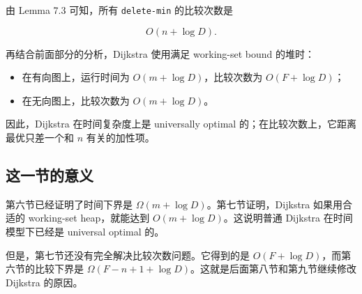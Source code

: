 \documentclass[UTF8]{ctexart}
\begin{document}
由 Lemma 7.3 可知，所有 \texttt{delete-min} 的比较次数是

\[
O(n+\log D).
\]

再结合前面部分的分析，Dijkstra 使用满足 working-set bound 的堆时：

\begin{itemize}
  \item 在有向图上，运行时间为 \(O(m+\log D)\)，比较次数为 \(O(F+\log D)\)；
  \item 在无向图上，比较次数为 \(O(m+\log D)\)。
\end{itemize}

因此，Dijkstra 在时间复杂度上是 universally optimal 的；在比较次数上，它距离最优只差一个和 \(n\) 有关的加性项。

\subsection*{这一节的意义}

第六节已经证明了时间下界是 \(\Omega(m+\log D)\)。第七节证明，Dijkstra 如果用合适的 working-set heap，就能达到 \(O(m+\log D)\)。这说明普通 Dijkstra 在时间模型下已经是 universal optimal 的。

但是，第七节还没有完全解决比较次数问题。它得到的是 \(O(F+\log D)\)，而第六节的比较下界是 \(\Omega(F-n+1+\log D)\)。这就是后面第八节和第九节继续修改 Dijkstra 的原因。
\end{document}

